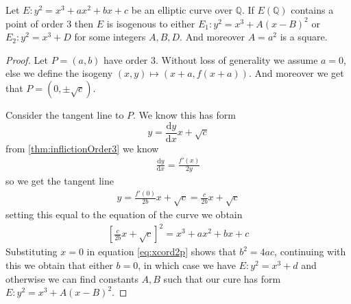 \begin{theorem} \label{thm:isogenousOrder3}
  Let $E: y^2 = x^3 + a x^2 + bx + c$ be an elliptic curve over $\mathbb{Q}$.
  If $E(\mathbb{Q})$ contains a point of order 3 then
  $E$ is isogenous to either $E_1: y^2 = x^3 + A(x-B)^2$ or $E_2: y^2 = x^3 + D$
  for some integers $A, B, D$. And moreover $A = a^2$ is a square.
\end{theorem}
\begin{proof}
  Let $P = (a, b)$ have order 3. Without loss of generality we assume $a = 0$,
  else we define the isogeny $(x, y) \mapsto (x + a, f(x + a))$.
  And moreover we get that $P = (0, \pm\sqrt{c})$.

  Consider the tangent line to $P$. We know this has form
  \[ y = \frac{\mathrm{d}y}{\mathrm{d}x} x + \sqrt{c}  \]
  from \ref{thm:inflictionOrder3} we know
  \begin{align*}
    \frac{\mathrm{d}y}{\mathrm{d}x} = \frac{f'(x)}{2y}
  \end{align*}
  so we get the tangent line
  \begin{align*}
    y = \frac{f'(0)}{2b}x + \sqrt{c} = \frac{c}{2b} x + \sqrt{c}
  \end{align*}
  setting this equal to the equation of the curve we obtain
  \begin{align*}
    \left[ \frac{c}{2b} x + \sqrt{c} \right]^2 = x^3 + ax^2 + bx + c
  \end{align*}
  Substituting $x = 0$ in equation \ref{eq:xcord2p} shows that $b^2 = 4ac$,
  continuing with this we obtain that either $b = 0$, in which case
  we have $E: y^2 = x^3 + d$ and otherwise we can find constants $A, B$
  such that our cure has form $E: y^2 = x^3 + A(x - B)^2$.
\end{proof}
